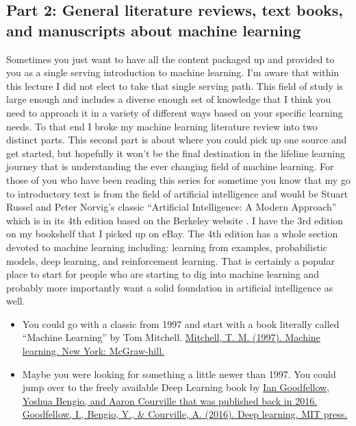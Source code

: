 \documentclass{article}
\begin{document}
\subsection{Part 2: General literature reviews, text books, and manuscripts about machine learning}
Sometimes you just want to have all the content packaged up and provided to you as a single serving introduction to machine learning. I’m aware that within this lecture I did not elect to take that single serving path. This field of study is large enough and includes a diverse enough set of knowledge that I think you need to approach it in a variety of different ways based on your specific learning needs. To that end I broke my machine learning literature review into two distinct parts. This second part is about where you could pick up one source and get started, but hopefully it won’t be the final destination in the lifeline learning journey that is understanding the ever changing field of machine learning. For those of you who have been reading this series for sometime you know that my go to introductory text is from the field of artificial intelligence and would be Stuart Russel and Peter Norvig’s classic “Artificial Intelligence: A Modern Approach” which is in its 4th edition based on the Berkeley website \cite{rusell2003artificial}. I have the 3rd edition on my bookshelf that I picked up on eBay. The 4th edition has a whole section devoted to machine learning including: learning from examples, probabilistic models, deep learning, and reinforcement learning. That is certainly a popular place to start for people who are starting to dig into machine learning and probably more importantly want a solid foundation in artificial intelligence as well. 

\begin{itemize}
\item You could go with a classic from 1997 and start with a book literally called “Machine Learning” by Tom Mitchell. \href{http://www.cs.cmu.edu/~tom/files/MachineLearningTomMitchell.pdf}{Mitchell, T. M. (1997). Machine learning. New York: McGraw-hill.} \cite{mitchell1997machine}
\item Maybe you were looking for something a little newer than 1997. You could jump over to the freely available Deep Learning book by \href{https://www.deeplearningbook.org/}{Ian Goodfellow, Yoshua Bengio, and Aaron Courville that was published back in 2016. Goodfellow, I., Bengio, Y., \& Courville, A. (2016). Deep learning. MIT press.} \cite{Goodfellow-et-al-2016}
\end{itemize}
\end{document}
